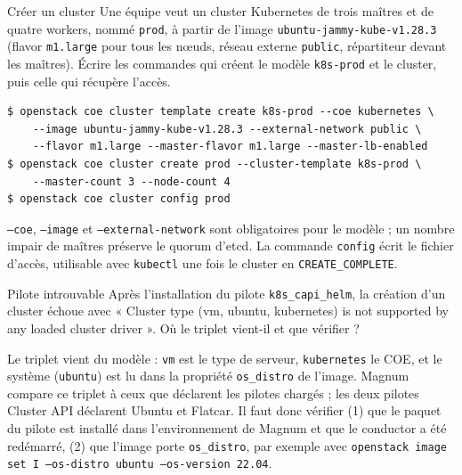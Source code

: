 \begin{exercice}{Créer un cluster}\label{ex:ma-creer}
Une équipe veut un cluster Kubernetes de trois maîtres et de quatre workers, nommé \texttt{prod}, à partir de l'image
\texttt{ubuntu-jammy-kube-v1.28.3} (flavor \texttt{m1.large} pour tous les nœuds, réseau externe \texttt{public}, répartiteur
devant les maîtres). Écrire les commandes qui créent le modèle \texttt{k8s-prod} et le cluster, puis celle qui récupère
l'accès.
\end{exercice}
\begin{correction}
\begin{lstlisting}
$ openstack coe cluster template create k8s-prod --coe kubernetes \
    --image ubuntu-jammy-kube-v1.28.3 --external-network public \
    --flavor m1.large --master-flavor m1.large --master-lb-enabled
$ openstack coe cluster create prod --cluster-template k8s-prod \
    --master-count 3 --node-count 4
$ openstack coe cluster config prod
\end{lstlisting}
\texttt{--coe}, \texttt{--image} et \texttt{--external-network} sont obligatoires pour le modèle ; un nombre impair de maîtres
préserve le quorum d'etcd. La commande \texttt{config} écrit le fichier d'accès, utilisable avec \texttt{kubectl} une fois le
cluster en \texttt{CREATE\_COMPLETE}.
\end{correction}

\begin{exercice}{Pilote introuvable}\label{ex:ma-pilote}
Après l'installation du pilote \texttt{k8s\_capi\_helm}, la création d'un cluster échoue avec « Cluster type (vm, ubuntu,
kubernetes) is not supported by any loaded cluster driver ». Où le triplet vient-il et que vérifier ?
\end{exercice}
\begin{correction}
Le triplet vient du modèle : \texttt{vm} est le type de serveur, \texttt{kubernetes} le COE, et le système (\texttt{ubuntu}) est
lu dans la propriété \texttt{os\_distro} de l'image. Magnum compare ce triplet à ceux que déclarent les pilotes chargés ; les
deux pilotes Cluster API déclarent Ubuntu et Flatcar. Il faut donc vérifier (1) que le paquet du pilote est installé dans
l'environnement de Magnum et que le conductor a été redémarré, (2) que l'image porte \texttt{os\_distro}, par exemple avec
\texttt{openstack image set I --os-distro ubuntu --os-version 22.04}.
\end{correction}

